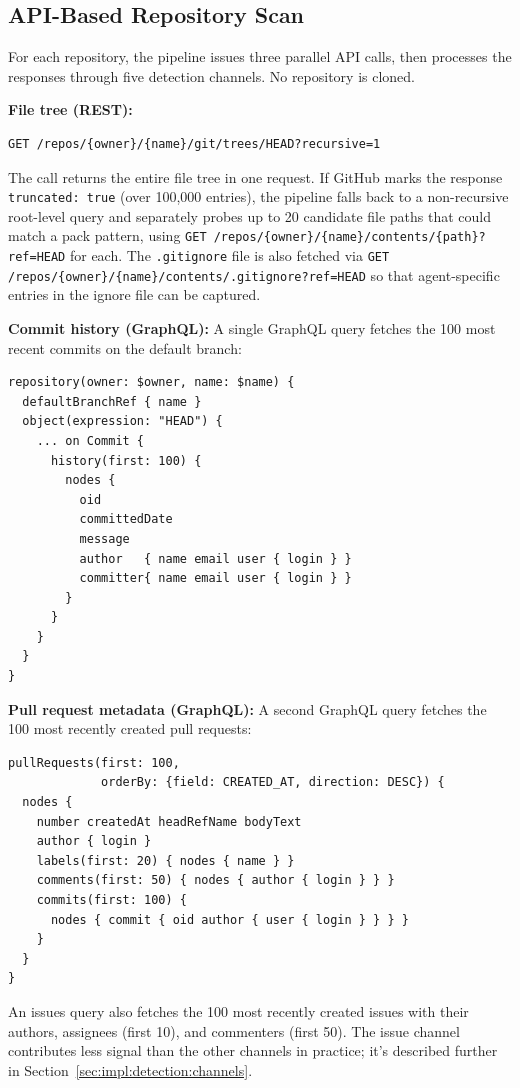 \subsection{API-Based Repository Scan}

For each repository, the pipeline issues three parallel API calls, then processes the responses through five detection channels. No repository is cloned.

\textbf{File tree (REST):}
\begin{verbatim}
GET /repos/{owner}/{name}/git/trees/HEAD?recursive=1
\end{verbatim}
The call returns the entire file tree in one request. If GitHub marks the response \texttt{truncated: true} (over 100,000 entries), the pipeline falls back to a non-recursive root-level query and separately probes up to 20 candidate file paths that could match a pack pattern, using \texttt{GET /repos/\{owner\}/\{name\}/contents/\{path\}?ref=HEAD} for each. The \texttt{.gitignore} file is also fetched via \texttt{GET /repos/\{owner\}/\{name\}/contents/.gitignore?ref=HEAD} so that agent-specific entries in the ignore file can be captured.

\textbf{Commit history (GraphQL):} A single GraphQL query fetches the 100 most recent commits on the default branch:

\begin{verbatim}
repository(owner: $owner, name: $name) {
  defaultBranchRef { name }
  object(expression: "HEAD") {
    ... on Commit {
      history(first: 100) {
        nodes {
          oid
          committedDate
          message
          author   { name email user { login } }
          committer{ name email user { login } }
        }
      }
    }
  }
}
\end{verbatim}

\textbf{Pull request metadata (GraphQL):} A second GraphQL query fetches the 100 most recently created pull requests:

\begin{verbatim}
pullRequests(first: 100,
             orderBy: {field: CREATED_AT, direction: DESC}) {
  nodes {
    number createdAt headRefName bodyText
    author { login }
    labels(first: 20) { nodes { name } }
    comments(first: 50) { nodes { author { login } } }
    commits(first: 100) {
      nodes { commit { oid author { user { login } } } }
    }
  }
}
\end{verbatim}

An issues query also fetches the 100 most recently created issues with their authors, assignees (first 10), and commenters (first 50). The issue channel contributes less signal than the other channels in practice; it's described further in Section~\ref{sec:impl:detection:channels}.

